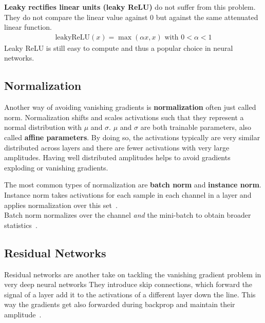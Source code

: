 \textbf{Leaky rectifies linear units (leaky ReLU)} do not suffer from this problem.
They do not compare the linear value against $0$ but against the same attenuated linear function.
\begin{align}
    \text{leakyReLU}(x) = \max(\alpha x, x) \text{ with } 0 < \alpha < 1
\end{align}
Leaky ReLU is still easy to compute and thus a popular choice in neural networks.

\subsection{Normalization}
Another way of avoiding vanishing gradients is \textbf{normalization} often just called norm.
Normalization shifts and scales activations such that they represent a normal distribution with $\mu$ and $\sigma$.
$\mu$ and $\sigma$ are both trainable parameters, also called \textbf{affine parameters}.
By doing so, the activations typically are very similar distributed across layers and there are fewer activations with very large amplitudes.
Having well distributed amplitudes helps to avoid gradients exploding or vanishing gradients.

The most common types of normalization are \textbf{batch norm} and \textbf{instance norm}.
Instance norm takes activations for each sample in each channel in a layer and applies normalization over this set~\cite{IN}.\\
Batch norm normalizes over the channel \textit{and} the mini-batch to obtain broader statistics~\cite{BN}.

\subsection{Residual Networks}
Residual networks are another take on tackling the vanishing gradient problem in very deep neural networks 
They introduce skip connections, which forward the signal of a layer add it to the activations of a different layer down the line.
This way the gradients get also forwarded during backprop and maintain their amplitude~\cite{res_net}.

